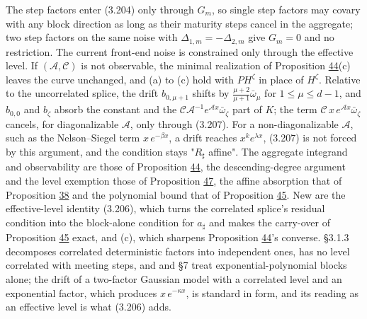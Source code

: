 \documentclass[11pt]{article}
\begin{document}
The step factors enter (3.204) only through \(G_m\), so single step factors may covary with any block direction as long as their maturity steps cancel in the aggregate; two step factors on the same noise with \(\Delta_{1,m}=-\Delta_{2,m}\) give \(G_m=0\) and no restriction. The current front-end noise is constrained only through the effective level. If \((\mathcal A,\mathcal C)\) is not observable, the minimal realization of Proposition \hyperref[res:Proposition-44]{44}(c) leaves the curve unchanged, and (a) to (c) hold with \(PH^\zeta\) in place of \(H^\zeta\). Relative to the uncorrelated splice, the drift \(b_{0,\mu+1}\) shifts by \(\frac{\mu+2}{\mu+1}\bar\omega_\mu\) for \(1\le\mu\le d-1\), and \(b_{0,0}\) and \(b_\zeta\) absorb the constant and the \(\mathcal C\mathcal A^{-1}e^{\mathcal Ax}\bar\omega_\zeta\) part of \(K\); the term \(\mathcal C\,x\,e^{\mathcal Ax}\bar\omega_\zeta\) cancels, for diagonalizable \(\mathcal A\), only through (3.207). For a non-diagonalizable \(\mathcal A\), such as the Nelson--Siegel term \(x\,e^{-\beta x}\), a drift reaches \(x^ke^{\lambda x}\), (3.207) is not forced by this argument, and the condition stays "\(R_\sharp\) affine". The aggregate integrand and observability are those of Proposition \hyperref[res:Proposition-44]{44}, the descending-degree argument and the level exemption those of Proposition \hyperref[res:Proposition-47]{47}, the affine absorption that of Proposition \hyperref[res:Proposition-38]{38} and the polynomial bound that of Proposition \hyperref[res:Proposition-45]{45}. New are the effective-level identity (3.206), which turns the correlated splice's residual condition into the block-alone condition for \(a_\sharp\) and makes the carry-over of Proposition \hyperref[res:Proposition-45]{45} exact, and (c), which sharpens Proposition \hyperref[res:Proposition-44]{44}'s converse. \cite{gellert2021short} §3.1.3 decomposes correlated deterministic factors into independent ones, \cite{brace2024sofr} has no level correlated with meeting steps, and \cite{filipovic2000exponential} and \cite{bjork1999interest} §7 treat exponential-polynomial blocks alone; the drift of a two-factor Gaussian model with a correlated level and an exponential factor, which produces \(x\,e^{-\kappa x}\), is standard in form, and its reading as an effective level is what (3.206) adds.
\end{document}
